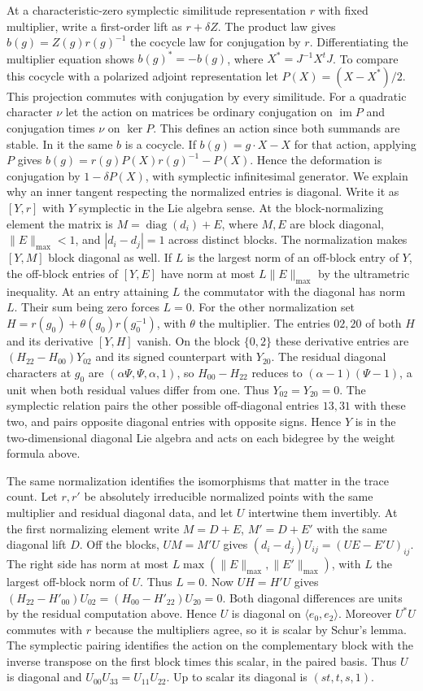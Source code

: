 \documentclass[11pt]{amsart}
\theoremstyle{definition}
\theoremstyle{remark}
\begin{document}
At a characteristic-zero symplectic similitude representation $r$
with fixed multiplier, write a first-order lift as $r+\delta Z$.
The product law gives $b(g)=Z(g)r(g)^{-1}$ the cocycle law for
conjugation by $r$. Differentiating the multiplier equation shows
$b(g)^*=-b(g)$, where $X^*=J^{-1}X^tJ$. To compare this cocycle
with a polarized adjoint representation let $P(X)=(X-X^*)/2$.
This projection commutes with conjugation by every similitude.
For a quadratic character $\nu$ let the action on matrices be
ordinary conjugation on $\operatorname{im}P$ and conjugation times
$\nu$ on $\ker P$. This defines an action since both summands are
stable. In it the same $b$ is a cocycle. If $b(g)=g\cdot X-X$
for that action, applying $P$ gives
$b(g)=r(g)P(X)r(g)^{-1}-P(X)$. Hence the deformation is conjugation
by $1-\delta P(X)$, with symplectic infinitesimal generator.
We explain why an inner tangent respecting the normalized entries
is diagonal. Write it as $[Y,r]$ with $Y$ symplectic in the Lie
algebra sense. At the block-normalizing element the matrix is
$M=\operatorname{diag}(d_i)+E$, where $M,E$ are block diagonal,
$\|E\|_{\max}<1$, and $|d_i-d_j|=1$ across distinct blocks.
The normalization makes $[Y,M]$ block diagonal as well. If $L$
is the largest norm of an off-block entry of $Y$, the off-block
entries of $[Y,E]$ have norm at most $L\|E\|_{\max}$ by the
ultrametric inequality. At an entry attaining $L$ the commutator
with the diagonal has norm $L$. Their sum being zero forces $L=0$.
For the other normalization set
$H=r(g_0)+\theta(g_0)r(g_0^{-1})$, with $\theta$ the multiplier.
The entries $02,20$ of both $H$ and its derivative $[Y,H]$
vanish. On the block $\{0,2\}$ these derivative entries are
$(H_{22}-H_{00})Y_{02}$ and its signed counterpart with $Y_{20}$.
The residual diagonal characters at $g_0$ are
$(\alpha\Psi,\Psi,\alpha,1)$, so $H_{00}-H_{22}$ reduces to
$(\alpha-1)(\Psi-1)$, a unit when both residual values differ
from one. Thus $Y_{02}=Y_{20}=0$. The symplectic relation pairs
the other possible off-diagonal entries $13,31$ with these two,
and pairs opposite diagonal entries with opposite signs. Hence $Y$
is in the two-dimensional diagonal Lie algebra and acts on each
bidegree by the weight formula above.

The same normalization identifies the isomorphisms that matter in
the trace count. Let $r,r'$ be absolutely irreducible normalized
points with the same multiplier and residual diagonal data, and
let $U$ intertwine them invertibly. At the first normalizing element
write $M=D+E$, $M'=D+E'$ with the same diagonal lift $D$.
Off the blocks, $UM=M'U$ gives
$(d_i-d_j)U_{ij}=(UE-E'U)_{ij}$. The right side has norm at
most $L\max(\|E\|_{\max},\|E'\|_{\max})$, with $L$ the largest
off-block norm of $U$. Thus $L=0$. Now $UH=H'U$ gives
$(H_{22}-H'_{00})U_{02}=(H_{00}-H'_{22})U_{20}=0$.
Both diagonal differences are units by the residual computation
above. Hence $U$ is diagonal on $\langle e_0,e_2\rangle$.
Moreover $U^*U$ commutes with $r$ because the multipliers agree,
so it is scalar by Schur's lemma. The symplectic pairing identifies
the action on the complementary block with the inverse transpose
on the first block times this scalar, in the paired basis.
Thus $U$ is diagonal and $U_{00}U_{33}=U_{11}U_{22}$.
Up to scalar its diagonal is $(st,t,s,1)$.
\end{document}
